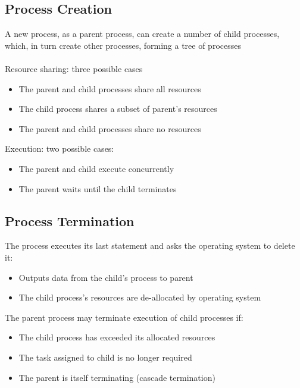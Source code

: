 \documentclass{article}[18pt]
\begin{document}
\subsection{Process Creation}
A new process, as a parent process, can create a number of child processes, which, in turn create other processes, forming a tree of processes\\
\\
Resource sharing: three possible cases
\begin{itemize}
	\item The parent and child processes share all resources
	\item The child process shares a subset of parent's resources
	\item The parent and child processes share no resources
\end{itemize}
Execution: two possible cases:
\begin{itemize}
	\item The parent and child execute concurrently
	\item The parent waits until the child terminates
\end{itemize}
\subsection{Process Termination}
The process executes its last statement and asks the operating system to delete it:
\begin{itemize}
	\item Outputs data from the child's process to parent
	\item The child process's resources are de-allocated by operating system
\end{itemize}
The parent process may terminate execution of child processes if:
\begin{itemize}
	\item The child process has exceeded its allocated resources
	\item The task assigned to child is no longer required
	\item The parent is itself terminating (cascade termination)
\end{itemize}
\end{document}
